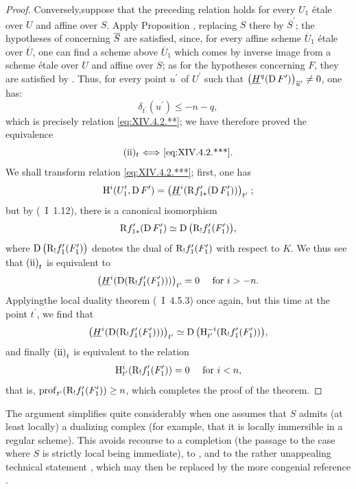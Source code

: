 \begin{proof}
Conversely,\pageoriginale suppose that the preceding relation holds for every $U_{1}$ étale over $U$ and affine over $S$. Apply Proposition , replacing $S$ there by $\overline{S}^{\prime}$; the hypotheses of  concerning $\sisi{S}{\overline{S}}$ are satisfied, since, for every affine scheme $\overline{U}_{1}$ étale over $\overline{U}$, one can find a scheme above $\overline{U}_{1}$ which comes by inverse image from a scheme étale over $U$ and affine over $S$; as for the hypotheses concerning $F$, they are satisfied by . Thus, for every point $u^{\prime}$ of $U^{\prime}$ such that $\big(\underline{H}^{q}(\D F^{\prime})\big)_{\overline{u}^{\prime}}\neq 0$, one has:
$$
\delta_{t^{\prime}}(u^{\prime})\leq -n-q,
$$
which is precisely relation \eqref{eq:XIV.4.2.**}; we have therefore proved the equivalence
$$
\text{\textup{(ii)}$_{t}$\SSI\eqref{eq:XIV.4.2.***}}.
$$
We shall transform relation \eqref{eq:XIV.4.2.***}; first, one has
$$
\H^{i}(U_{1}^{\prime}, \D F^{\prime})=\big(\underline{H}^{i}(\R f_{1\ast}^{\prime}(\D F_{1}^{\prime}))\big)_{t^{\prime}}\;;$$
but by (~I~1.12), there is a canonical isomorphism
$$
\R f_{1\ast}^{\prime}(\D F_{1}^{\prime})\simeq\D\big(\R_{!}f_{1}^{\prime}(F_{1}^{\prime})\big),
$$
where $\D\big(\R_{!}f_{1}^{\prime}(F_{1}^{\prime})\big)$ denotes the dual of $\R_{!}f_{1}^{\prime}(F_{1}^{\prime})$ with respect to $K$. We thus see that $\textup{(ii)}_{t}$ is equivalent to
$$
\big(\underline{H}^{i}(\D(\R_{!}f_{1}^{\prime}(F_{1}^{\prime})))\big)_{t^{\prime}}=0\quad\textrm{ for }i>-n.
$$
Applying\pageoriginale the local duality theorem (~I~4.5.3) once again, but this time at the point $t^{\prime}$, we find that
$$
\big(\underline{H}^{i}(\D(\R_{!}f_{1}^{\prime}(F_{1}^{\prime})))\big)_{t^{\prime}}\simeq\D\big(\H_{t^{\prime}}^{-i}(\R_{!}f_{1}^{\prime}(F_{1}^{\prime}))\big),
$$
and finally $\textup{(ii)}_{t}$ is equivalent to the relation
$$
\H_{t^{\prime}}^{i}(\R_{!}f_{1}^{\prime}(F_{1}^{\prime}))=0\quad\textrm{ for }i<n,
$$
that is, $\prof_{t^{\prime}}(\R_{!}f_{1}^{\prime}(F_{1}^{\prime}))\geq n$, which completes the proof of the theorem.
\skipqed
\end{proof}

\begin{subremarque} \label{XIV.4.2.3}
The argument simplifies quite considerably when one assumes that $S$ admits (at least locally) a dualizing complex (for example, that it is locally immersible in a regular scheme). This avoids recourse to a completion (the passage to the case where $S$ is strictly local being immediate), to , and to the rather unappealing technical statement , which may then be replaced by the more congenial reference .
\end{subremarque}

